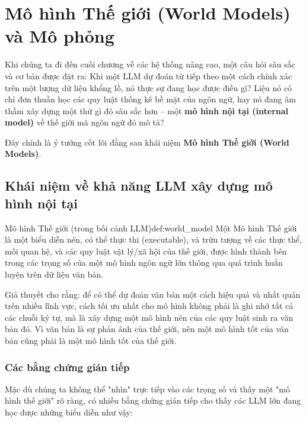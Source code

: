 
\section{Mô hình Thế giới (World Models) và Mô phỏng}
\label{sec:world_models}

Khi chúng ta đi đến cuối chương về các hệ thống nâng cao, một câu hỏi sâu sắc và cơ bản được đặt ra: Khi một LLM dự đoán từ tiếp theo một cách chính xác trên một lượng dữ liệu khổng lồ, nó thực sự đang học được điều gì? Liệu nó có chỉ đơn thuần học các quy luật thống kê bề mặt của ngôn ngữ, hay nó đang âm thầm xây dựng một thứ gì đó sâu sắc hơn -- một \textbf{mô hình nội tại (internal model)} về thế giới mà ngôn ngữ đó mô tả?

Đây chính là ý tưởng cốt lõi đằng sau khái niệm \textbf{Mô hình Thế giới (World Models)}.

\subsection{Khái niệm về khả năng LLM xây dựng mô hình nội tại}
\label{ssec:internal_world_model_concept}

\begin{definition}{Mô hình Thế giới (trong bối cảnh LLM)}{def:world_model}
    Một Mô hình Thế giới là một biểu diễn nén, có thể thực thi (executable), và trừu tượng về các thực thể, mối quan hệ, và các quy luật vật lý/xã hội của thế giới, được hình thành bên trong các trọng số của một mô hình ngôn ngữ lớn thông qua quá trình huấn luyện trên dữ liệu văn bản.
\end{definition}

\begin{tcolorbox}[
    title=Triết lý của Mô hình Thế giới,
    colback=blue!5!white, colframe=blue!75!black, fonttitle=\bfseries
]
Giả thuyết cho rằng: để có thể dự đoán văn bản một cách hiệu quả và nhất quán trên nhiều lĩnh vực, cách tối ưu nhất cho mô hình không phải là ghi nhớ tất cả các chuỗi ký tự, mà là xây dựng một mô hình nén của các quy luật sinh ra văn bản đó. Vì văn bản là sự phản ánh của thế giới, nên một mô hình tốt của văn bản cũng phải là một mô hình tốt của thế giới.
\end{tcolorbox}

\subsubsection{Các bằng chứng gián tiếp}
Mặc dù chúng ta không thể "nhìn" trực tiếp vào các trọng số và thấy một "mô hình thế giới" rõ ràng, có nhiều bằng chứng gián tiếp cho thấy các LLM lớn đang học được những biểu diễn như vậy:
